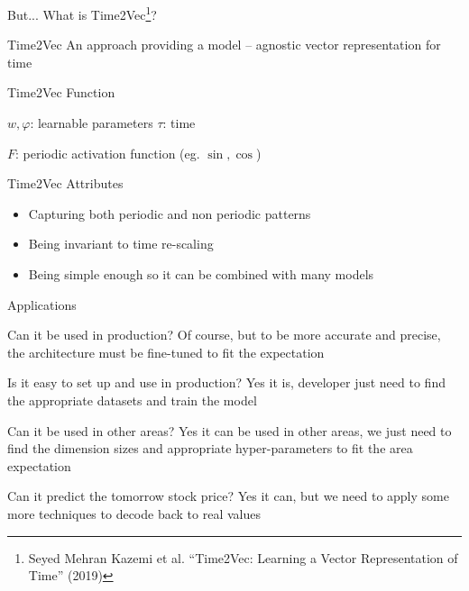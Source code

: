 \documentclass[compress, mathserif, fleqn, 10pt]{beamer}
\begin{document}
	\begin{frame}{But... What is Time2Vec\footnote[1]{Seyed Mehran Kazemi et al. “Time2Vec: Learning a Vector Representation of
				Time” (2019)}?}
		
		\begin{block}{Time2Vec}
			An approach providing a model – agnostic vector representation for time
		\end{block}
		
		\begin{block}{Time2Vec Function}
			
			\smallskip
			
			$w, \varphi$: learnable parameters \space $\tau$: time
			
			$F$: periodic activation function (eg. $\sin, \cos$)
		\end{block}
		
		\begin{block}{Time2Vec Attributes}
			\begin{itemize}
				\item Capturing both periodic and non periodic patterns
				
				\item Being invariant to time re-scaling
				
				\item Being simple enough so it can be combined with many models
			\end{itemize}
		\end{block}
	\end{frame}

	\begin{frame}{Applications}
		\begin{block}{Can it be used in production?}
			Of course, but to be more accurate and precise, the architecture must be fine-tuned to fit the expectation
		\end{block}
		
		\begin{exampleblock}{Is it easy to set up and use in production?}
			Yes it is, developer just need to find the appropriate datasets and train the model
		\end{exampleblock}
		
		\begin{block}{Can it be used in other areas?}
			Yes it can be used in other areas, we just need to find the dimension sizes and appropriate hyper-parameters to fit the area expectation
		\end{block}
		
		\begin{exampleblock}{Can it predict the tomorrow stock price?}
			Yes it can, but we need to apply some more techniques to decode back to real values
		\end{exampleblock}
	\end{frame}
\end{document}
